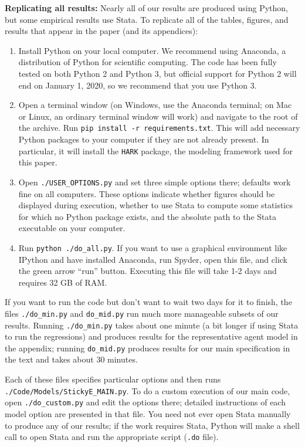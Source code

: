 \documentclass[12pt,pdftex,letterpaper]{article}
\begin{document}
\noindent \textbf{Replicating all results:} Nearly all of our results are produced using Python, but some empirical results use Stata.  To replicate all of the tables, figures, and results that appear in the paper (and its appendices):
\begin{enumerate}
\item Install Python on your local computer.  We recommend using Anaconda, a distribution of Python for scientific computing.  The code has been fully tested on both Python 2 and Python 3, but official support for Python 2 will end on January 1, 2020, so we recommend that you use Python 3.

\item Open a terminal window (on Windows, use the Anaconda terminal; on Mac or Linux, an ordinary terminal window will work) and navigate to the root of the archive.  Run \texttt{pip install -r requirements.txt}.  This will add necessary Python packages to your computer if they are not already present.  In particular, it will install the \texttt{HARK} package, the modeling framework used for this paper.

\item Open \texttt{./USER\_OPTIONS.py} and set three simple options there; defaults work fine on all computers.  These options indicate whether figures should be displayed during execution, whether to use Stata to compute some statistics for which no Python package exists, and the absolute path to the Stata executable on your computer.

\item Run \texttt{python ./do\_all.py}.  If you want to use a graphical environment like IPython and have installed Anaconda, run Spyder, open this file, and click the green arrow ``run'' button.  Executing this file will take 1-2 days and requires 32 GB of RAM.
\end{enumerate}

If you want to run the code but don't want to wait two days for it to finish, the files \texttt{./do\_min.py} and \texttt{do\_mid.py} run much more manageable subsets of our results.  Running \texttt{./do\_min.py} takes about one minute (a bit longer if using Stata to run the regressions) and produces results for the representative agent model in the appendix; running \texttt{do\_mid.py} produces results for our main specification in the text and takes about 30 minutes.

Each of these files specifies particular options and then runs \texttt{./Code/Models/StickyE\_MAIN.py}.  To do a custom execution of our main code, open \texttt{./do\_custom.py} and edit the options there; detailed instructions of each model option are presented in that file.  You need not ever open Stata manually to produce any of our results; if the work requires Stata, Python will make a shell call to open Stata and run the appropriate script (\texttt{.do} file).
\end{document}
